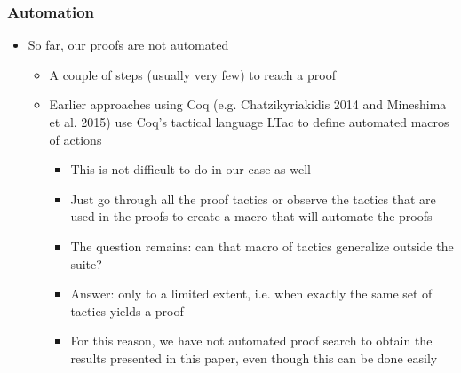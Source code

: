 \documentclass[11pt]{beamer}
\begin{document}
\begin{frame}[fragile]
	\frametitle{Automation}
	
	\begin{itemize}
		
		\item So far, our proofs are not automated
		
		\begin{itemize}
			
			\item A couple of steps (usually very few) to reach a proof
			
			\item Earlier approaches using Coq (e.g. Chatzikyriakidis 2014 and Mineshima et al. 2015) use Coq's tactical language LTac to define automated macros of actions
			
			
				\begin{itemize}
					
					\item This is not difficult to do in our case as well
					
					\item Just go through all the proof
					tactics or observe the tactics that are used in the proofs to create a
					macro that will automate the proofs
					
					\item The question remains: can that macro of tactics
					generalize outside the suite?
					
					\item Answer: only to a limited
					extent, i.e. when exactly the same set of tactics yields a proof
					
					\item For
					this reason, we have not automated proof search to obtain the results
					presented in this paper, even though this can be done easily


\end{itemize}\end{itemize}







\end{itemize}

\end{frame}	
\end{document}
